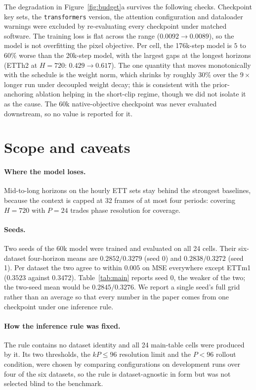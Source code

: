 The degradation in Figure~\ref{fig:budget}a survives the following checks. Checkpoint key sets,
the \texttt{transformers} version, the attention configuration and dataloader warnings were excluded
by re-evaluating every checkpoint under matched software. The training loss is flat across the range
($0.0092 \to 0.0089$), so the model is not overfitting the pixel objective. Per cell, the 176k-step
model is $5$ to $60\%$ worse than the 20k-step model, with the largest gaps at the longest horizons
(ETTh2 at $H{=}720$: $0.429 \to 0.617$). The one quantity that moves monotonically with the
schedule is the weight norm, which shrinks by roughly $30\%$ over the $9\times$ longer run under
decoupled weight decay; this is consistent with the prior-anchoring ablation helping in the
short-clip regime, though we did not isolate it as the cause. The 60k native-objective checkpoint
was never evaluated downstream, so no value is reported for it.

\section{Scope and caveats}
\label{app:scope}

\paragraph{Where the model loses.} Mid-to-long horizons on the hourly ETT sets stay behind the
strongest baselines, because the context is capped at 32 frames of at most four periods: covering
$H{=}720$ with $P{=}24$ trades phase resolution for coverage.

\paragraph{Seeds.} Two seeds of the 60k model were trained and evaluated on all 24 cells. Their
six-dataset four-horizon means are $0.2852/0.3279$ (seed 0) and $0.2838/0.3272$ (seed 1). Per
dataset the two agree to within $0.005$ on MSE everywhere except ETTm1 ($0.3523$ against $0.3472$).
Table~\ref{tab:main} reports seed 0, the weaker of the two; the two-seed mean would be
$0.2845/0.3276$. We report a single seed's full grid rather than an average so that every number in
the paper comes from one checkpoint under one inference rule.

\paragraph{How the inference rule was fixed.} The rule contains no dataset identity and all 24
main-table cells were produced by it. Its two thresholds, the $kP \le 96$ resolution limit and the
$P < 96$ rollout condition, were chosen by comparing configurations on development runs over four
of the six datasets, so the rule is dataset-agnostic in form but was not selected blind to the
benchmark.

